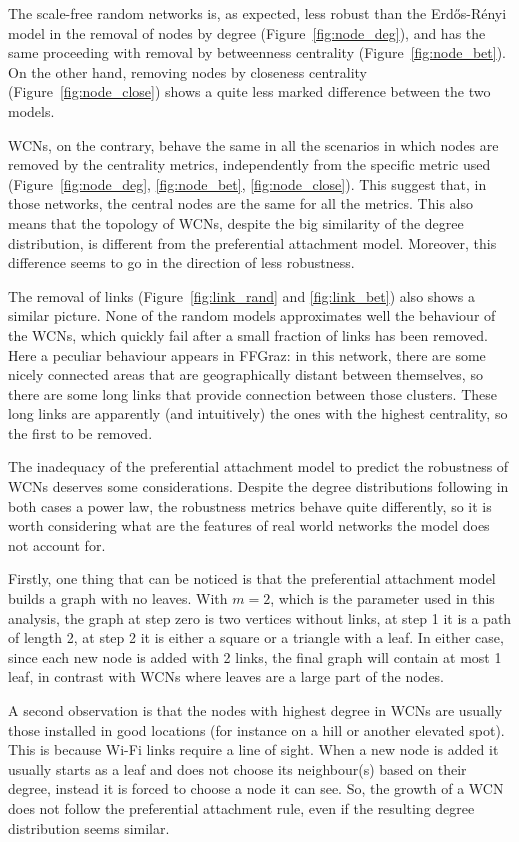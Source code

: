\documentclass[a4paper,11pt,twoside,openright]{memoir}
\newcommand{\figref}[1] {Figure~\ref{#1}}
\begin{document}
The scale-free random networks is, as expected, less robust than the
Erd\H{o}s-Rényi model in the removal of nodes by
degree (\figref{fig:node_deg}), and has the same proceeding with removal
by betweenness centrality (\figref{fig:node_bet}). On the
other hand, removing nodes by closeness centrality (\figref{fig:node_close})
shows a quite less marked difference between the two models.

WCNs, on the contrary, behave the same in all the scenarios in which
nodes are removed by the centrality metrics, independently from the specific
metric used
(\figref{fig:node_deg}, \ref{fig:node_bet}, \ref{fig:node_close}). This
suggest that, in those networks, the central nodes are the same for all
the metrics. This also means that the topology of WCNs, despite the big
similarity of the degree distribution, is different from the
preferential attachment model. Moreover, this difference seems to go in
the direction of less robustness.

The removal of links (\figref{fig:link_rand} and \ref{fig:link_bet})
also shows a similar picture. None of the random
models approximates well the behaviour of the WCNs, which quickly fail
after a small fraction of links has been removed. Here a peculiar
behaviour appears in FFGraz: in this network, there are some nicely
connected areas that are geographically distant between themselves, so
there are some long links that provide connection between those
clusters. These long links are apparently (and intuitively) the ones
with the highest centrality, so the first to be removed.

The inadequacy of the preferential attachment model to predict the
robustness of WCNs deserves some considerations. Despite the degree
distributions following in both cases a power law, the robustness
metrics behave quite differently, so it is worth considering what are
the features of real world networks the model does not account for.

Firstly, one thing that can be noticed is that the preferential
attachment model builds a graph with no leaves. With $m = 2$, which is
the parameter used in this analysis, the graph at step zero is two
vertices without links, at step 1 it is a path of length 2, at step 2 it
is either a square or a triangle with a leaf.
In either case, since each new node is added with 2 links, the final
graph will contain at most 1 leaf, in contrast with WCNs where leaves
are a large part of the nodes.

A second observation is that the nodes with highest degree in WCNs
are usually those installed in good locations (for instance on a hill
or another elevated spot). This is because Wi-Fi links require a line
of sight.
When a new node is added it usually starts as a leaf and does not choose
its neighbour(s) based on their degree, instead it is forced to choose
a node it can see.
So, the growth of a WCN does not follow the preferential attachment rule,
even if the resulting degree distribution seems similar.
\end{document}
